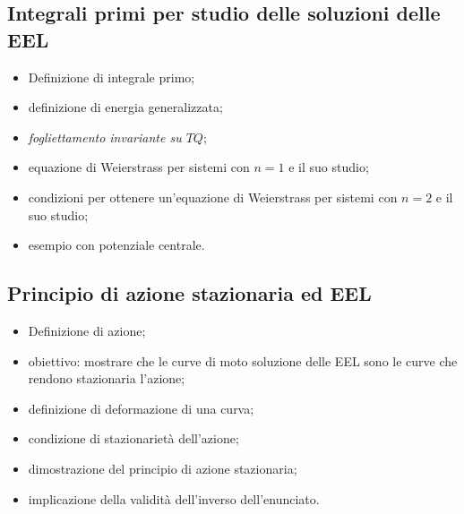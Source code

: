 \documentclass{article}
\theoremstyle{remark}
\begin{document}
\subsection{Integrali primi per studio delle soluzioni delle EEL}
\begin{itemize}
    \item Definizione di integrale primo;
    \item definizione di energia generalizzata;
    \item \textit{fogliettamento invariante su $TQ$};
    \item equazione di Weierstrass per sistemi con $n=1$ e il suo studio;
    \item condizioni per ottenere un'equazione di Weierstrass per sistemi con $n=2$ e il suo studio;
    \item esempio con potenziale centrale.
\end{itemize}
\subsection{Principio di azione stazionaria ed EEL}
\begin{itemize}
    \item Definizione di azione;
    \item obiettivo: mostrare che le curve di moto soluzione delle EEL sono le curve che rendono stazionaria l'azione;
    \item definizione di deformazione di una curva;
    \item condizione di stazionarietà dell'azione;
    \item dimostrazione del principio di azione stazionaria;
    \item implicazione della validità dell'inverso dell'enunciato.
\end{itemize}
\end{document}
